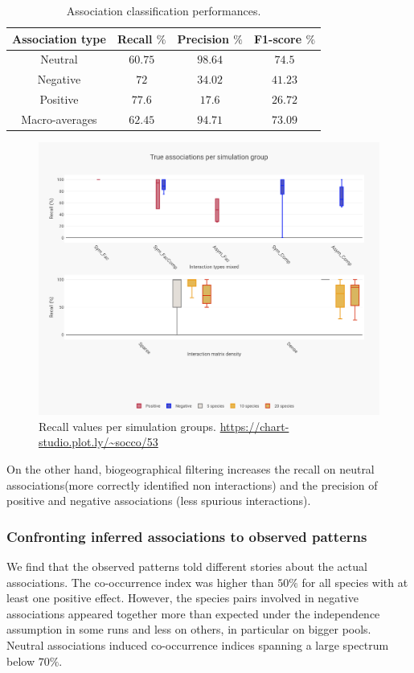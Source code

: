 \documentclass[]{article}
\newcommand{\commG}[1]{#1}
\begin{document}
\begin{table}[H]
\centering
\begin{tabular}{|c|c|c|c|}
	\hline 
	\textbf{Association type} & \textbf{Recall $\%$} & \textbf{Precision $\%$} & \textbf{F1-score $\%$} \\ 
	\hline 
	Neutral & $60.75$ & $98.64$ & $74.5$ \\ 
	\hline 
	Negative & $72 $ & $34.02$ & $41.23$ \\ 
	\hline 
	Positive & $77.6$ & $17.6$ & $26.72$ \\ 
	\hline 
	Macro-averages & $62.45$ & $94.71$ & $73.09$ \\ 
	\hline 
\end{tabular} 
\caption{Association classification performances.}\label{classmet}
\end{table}

\begin{figure}[H]
	\commG{\includegraphics[scale=0.155]{sim_perf}}
	\caption{Recall values per simulation groups. \url{https://chart-studio.plot.ly/~socco/53}}
	\label{simperf}
\end{figure}

On the other hand, biogeographical filtering increases the recall on neutral associations(more correctly identified non interactions) and the precision of positive and negative associations (less spurious interactions).

\subsubsection{Confronting inferred associations to observed patterns}
We find that the observed patterns told different stories about the actual associations. The co-occurrence index was higher than $50\%$ for all species with at least one positive effect. However, the species pairs involved in negative associations appeared together more than expected under the independence assumption in some runs and less on others, in particular on bigger pools. Neutral associations induced co-occurrence indices spanning a large spectrum below $70\%$. 
\end{document}
